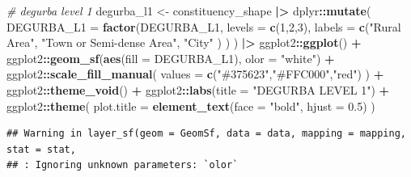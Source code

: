 \documentclass[
]{article}
\newenvironment{Shaded}{\begin{snugshade}}{\end{snugshade}}
\newcommand{\AttributeTok}[1]{\textcolor[rgb]{0.13,0.29,0.53}{#1}}
\newcommand{\CommentTok}[1]{\textcolor[rgb]{0.56,0.35,0.01}{\textit{#1}}}
\newcommand{\DecValTok}[1]{\textcolor[rgb]{0.00,0.00,0.81}{#1}}
\newcommand{\FloatTok}[1]{\textcolor[rgb]{0.00,0.00,0.81}{#1}}
\newcommand{\FunctionTok}[1]{\textcolor[rgb]{0.13,0.29,0.53}{\textbf{#1}}}
\newcommand{\NormalTok}[1]{#1}
\newcommand{\OtherTok}[1]{\textcolor[rgb]{0.56,0.35,0.01}{#1}}
\newcommand{\SpecialCharTok}[1]{\textcolor[rgb]{0.81,0.36,0.00}{\textbf{#1}}}
\newcommand{\StringTok}[1]{\textcolor[rgb]{0.31,0.60,0.02}{#1}}
\newenvironment{UNFPAShadedBox}{%
\begin{tcolorbox}[sharp corners, enhanced, colback=white, boxrule=0pt, borderline west={2pt}{0pt}{orange}]%
}{\end{tcolorbox}}
\newenvironment{Highlighting}{\begin{UNFPAShadedBox}}{\end{UNFPAShadedBox}}
\begin{document}
\begin{Shaded}
\begin{Highlighting}[]
\CommentTok{\# degurba level 1}
\NormalTok{degurba\_l1 }\OtherTok{\textless{}{-}}\NormalTok{ constituency\_shape }\SpecialCharTok{|\textgreater{}}
\NormalTok{  dplyr}\SpecialCharTok{::}\FunctionTok{mutate}\NormalTok{(}
    \AttributeTok{DEGURBA\_L1 =} \FunctionTok{factor}\NormalTok{(DEGURBA\_L1, }
                           \AttributeTok{levels =} \FunctionTok{c}\NormalTok{(}\DecValTok{1}\NormalTok{,}\DecValTok{2}\NormalTok{,}\DecValTok{3}\NormalTok{),}
                           \AttributeTok{labels =} \FunctionTok{c}\NormalTok{(}\StringTok{"Rural Area"}\NormalTok{,}
                                      \StringTok{"Town or Semi{-}dense Area"}\NormalTok{,}
                                      \StringTok{"City"}
\NormalTok{                                      )}
\NormalTok{                           )}
\NormalTok{    ) }\SpecialCharTok{|\textgreater{}}
\NormalTok{  ggplot2}\SpecialCharTok{::}\FunctionTok{ggplot}\NormalTok{() }\SpecialCharTok{+}
\NormalTok{  ggplot2}\SpecialCharTok{::}\FunctionTok{geom\_sf}\NormalTok{(}\FunctionTok{aes}\NormalTok{(}\AttributeTok{fill =}\NormalTok{ DEGURBA\_L1), }\AttributeTok{olor =} \StringTok{"white"}\NormalTok{) }\SpecialCharTok{+}
\NormalTok{  ggplot2}\SpecialCharTok{::}\FunctionTok{scale\_fill\_manual}\NormalTok{(}
    \AttributeTok{values =} \FunctionTok{c}\NormalTok{(}\StringTok{"\#375623"}\NormalTok{,}\StringTok{"\#FFC000"}\NormalTok{,}\StringTok{"red"}\NormalTok{)}
\NormalTok{    ) }\SpecialCharTok{+}
\NormalTok{  ggplot2}\SpecialCharTok{::}\FunctionTok{theme\_void}\NormalTok{() }\SpecialCharTok{+}
\NormalTok{  ggplot2}\SpecialCharTok{::}\FunctionTok{labs}\NormalTok{(}\AttributeTok{title =} \StringTok{"DEGURBA LEVEL 1"}\NormalTok{) }\SpecialCharTok{+}
\NormalTok{  ggplot2}\SpecialCharTok{::}\FunctionTok{theme}\NormalTok{(}
    \AttributeTok{plot.title =} \FunctionTok{element\_text}\NormalTok{(}\AttributeTok{face =} \StringTok{"bold"}\NormalTok{, }\AttributeTok{hjust =} \FloatTok{0.5}\NormalTok{)}
\NormalTok{  )}
\end{Highlighting}
\end{Shaded}

\begin{verbatim}
## Warning in layer_sf(geom = GeomSf, data = data, mapping = mapping, stat = stat,
## : Ignoring unknown parameters: `olor`
\end{verbatim}
\end{document}
